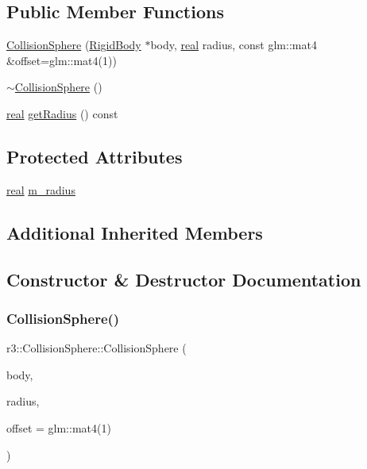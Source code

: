 \subsection*{Public Member Functions}
\begin{DoxyCompactItemize}
\item 
\mbox{\hyperlink{classr3_1_1_collision_sphere_a3b910b66d6b9689da9beba5ec151eba3}{Collision\+Sphere}} (\mbox{\hyperlink{classr3_1_1_rigid_body}{Rigid\+Body}} $\ast$body, \mbox{\hyperlink{namespacer3_ab2016b3e3f743fb735afce242f0dc1eb}{real}} radius, const glm\+::mat4 \&offset=glm\+::mat4(1))
\item 
\mbox{\hyperlink{classr3_1_1_collision_sphere_a3605a7afc888411c5fa52179122a8a77}{$\sim$\+Collision\+Sphere}} ()
\item 
\mbox{\hyperlink{namespacer3_ab2016b3e3f743fb735afce242f0dc1eb}{real}} \mbox{\hyperlink{classr3_1_1_collision_sphere_aa3b7687165b34ab82b3bedb0884cc65b}{get\+Radius}} () const
\end{DoxyCompactItemize}
\subsection*{Protected Attributes}
\begin{DoxyCompactItemize}
\item 
\mbox{\hyperlink{namespacer3_ab2016b3e3f743fb735afce242f0dc1eb}{real}} \mbox{\hyperlink{classr3_1_1_collision_sphere_abc9e3dcae422b4732a288fa19d89d466}{m\+\_\+radius}}
\end{DoxyCompactItemize}
\subsection*{Additional Inherited Members}


\subsection{Constructor \& Destructor Documentation}
\mbox{\label{classr3_1_1_collision_sphere_a3b910b66d6b9689da9beba5ec151eba3}} 
\subsubsection{\texorpdfstring{Collision\+Sphere()}{CollisionSphere()}}
{\footnotesize\ttfamily r3\+::\+Collision\+Sphere\+::\+Collision\+Sphere (\begin{DoxyParamCaption}\item[{\mbox{\hyperlink{classr3_1_1_rigid_body}{Rigid\+Body}} $\ast$}]{body,  }\item[{\mbox{\hyperlink{namespacer3_ab2016b3e3f743fb735afce242f0dc1eb}{real}}}]{radius,  }\item[{const glm\+::mat4 \&}]{offset = {\ttfamily glm\+:\+:mat4(1)} }\end{DoxyParamCaption})}

